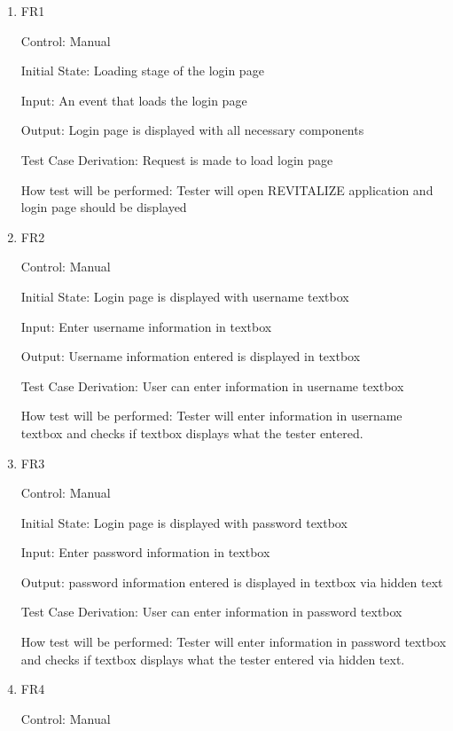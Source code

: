 \documentclass[12pt, titlepage]{article}
\begin{document}
\begin{enumerate}

\item{FR1\\}

Control: Manual
					
Initial State: Loading stage of the login page
					
Input: An event that loads the login page
					
Output: Login page is displayed with all necessary components

Test Case Derivation: Request is made to load login page
					
How test will be performed: Tester will open REVITALIZE application and login page should be displayed
					
\item{FR2\\}

Control: Manual
					
Initial State: Login page is displayed with username textbox
					
Input: Enter username information in textbox
					
Output: Username information entered is displayed in textbox

Test Case Derivation: User can enter information in username textbox

How test will be performed: Tester will enter information in username textbox and checks if textbox displays what the tester entered.

\item{FR3\\}

Control: Manual
					
Initial State: Login page is displayed with password textbox
					
Input: Enter password information in textbox
					
Output: password information entered is displayed in textbox via hidden text

Test Case Derivation: User can enter information in password textbox

How test will be performed: Tester will enter information in password textbox and checks if textbox displays what the tester entered via hidden text.

\item{FR4\\}

Control: Manual
					

\end{enumerate}
\end{document}
